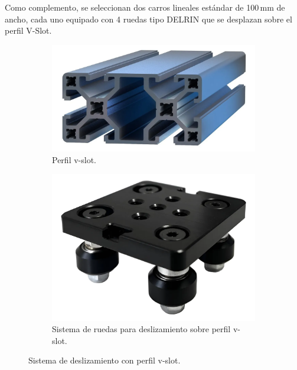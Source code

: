 Como complemento, se seleccionan dos carros lineales estándar de 100\,mm de ancho, cada uno equipado con 4 ruedas tipo DELRIN que se desplazan sobre el perfil V-Slot.
\begin{figure}[H]
    \centering
    \begin{subfigure}{0.4\textwidth}
        \centering
        \includegraphics[width=\textwidth]{img/vslot_40x80.png}
        \caption{Perfil v-slot.}
        \label{fig:vslot_40x80}
    \end{subfigure}
    \hfill
    \begin{subfigure}{0.4\textwidth}
        \centering
        \includegraphics[width=\textwidth]{img/carro_perfilvslot.png}
        \caption{Sistema de ruedas para deslizamiento sobre perfil v-slot.}
        \label{fig:carro_perfilvslot}
    \end{subfigure}
    \caption{Sistema de deslizamiento con perfil v-slot.}
\end{figure}

